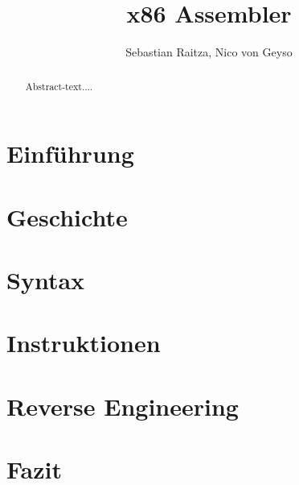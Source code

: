 \documentclass{lni}
\title{x86 Assembler}
\author{Sebastian Raitza, Nico von Geyso}
\begin{document}
\maketitle

\begin{abstract}
Abstract-text....
\end{abstract}

\section{Einführung}

\section{Geschichte}

\section{Syntax}

\section{Instruktionen}

\section{Reverse Engineering}

\section{Fazit}
\end{document}
